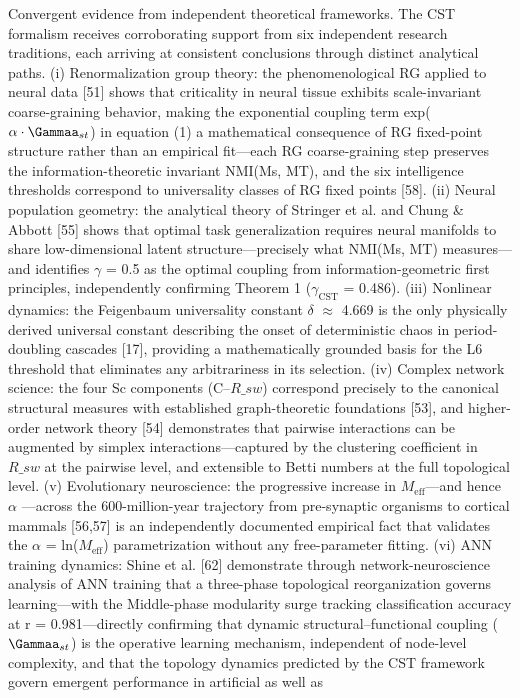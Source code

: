 \documentclass[a4paper,12pt]{article}
\begin{document}
Convergent evidence from independent theoretical frameworks.
The CST formalism receives corroborating support from six independent research traditions, each arriving at consistent conclusions through distinct analytical paths. (i) Renormalization group theory: the phenomenological RG applied to neural data [51] shows that criticality in neural tissue exhibits scale-invariant coarse-graining behavior, making the exponential coupling term
exp($\alpha \cdot \Gammaa_{st}$) in equation (1) a mathematical consequence of RG fixed-point structure rather than an empirical fit---each RG coarse-graining step preserves the information-theoretic invariant NMI(Ms, MT), and the six intelligence thresholds correspond to universality classes of RG fixed points [58]. (ii) Neural population geometry: the analytical theory of Stringer et al. and
Chung \& Abbott [55] shows that optimal task generalization requires neural manifolds to share low-dimensional latent structure---precisely what NMI(Ms, MT) measures---and identifies  $\gamma$  = 0.5 as the optimal coupling from information-geometric first principles, independently confirming Theorem 1 ($\gamma_{\text{CST}}$ = 0.486). (iii) Nonlinear dynamics: the Feigenbaum universality constant  $\delta$ 
 $\approx$  4.669 is the only physically derived universal constant describing the onset of deterministic chaos in period-doubling cascades [17], providing a mathematically grounded basis for the L6 threshold that eliminates any arbitrariness in its selection. (iv) Complex network science: the four Sc components (C--$R\_{sw}$) correspond precisely to the canonical structural measures with
established graph-theoretic foundations [53], and higher-order network theory [54] demonstrates that pairwise interactions can be augmented by simplex interactions---captured by the clustering coefficient in $R\_{sw}$ at the pairwise level, and extensible to Betti numbers at the full topological level. (v) Evolutionary neuroscience: the progressive increase in $M_{\text{eff}}$---and hence
 $\alpha$ ---across the 600-million-year trajectory from pre-synaptic organisms to cortical mammals [56,57] is an independently documented empirical fact that validates the  $\alpha$  = ln($M_{\text{eff}}$) parametrization without any free-parameter fitting. (vi) ANN training dynamics: Shine et al. [62] demonstrate through network-neuroscience analysis of ANN training that a three-phase topological
reorganization governs learning---with the Middle-phase modularity surge tracking classification accuracy at r = 0.981---directly confirming that dynamic structural--functional coupling ($\Gammaa_{st}$) is the operative learning mechanism, independent of node-level complexity, and that the topology dynamics predicted by the CST framework govern emergent performance in artificial as well as
\end{document}
